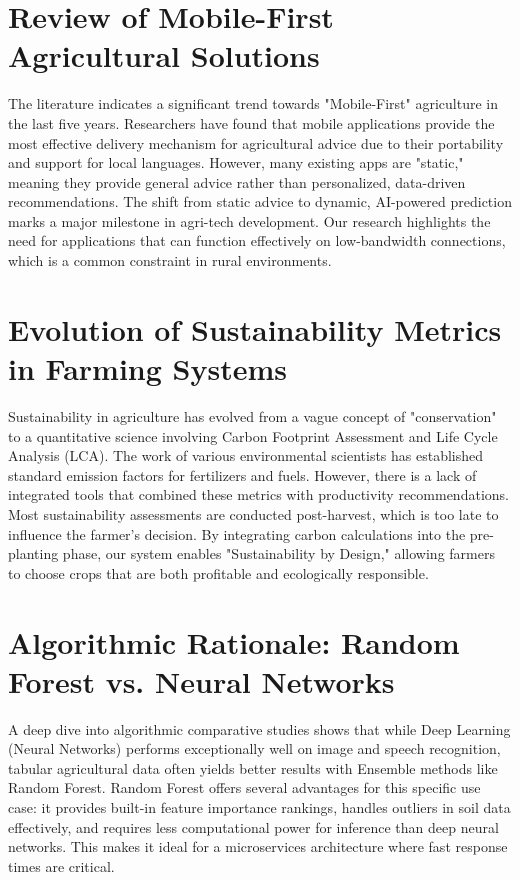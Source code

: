 \documentclass[12pt,a4paper]{report}
\begin{document}
\section{Review of Mobile-First Agricultural Solutions}
The literature indicates a significant trend towards "Mobile-First" agriculture in the last five years. Researchers have found that mobile applications provide the most effective delivery mechanism for agricultural advice due to their portability and support for local languages. However, many existing apps are "static," meaning they provide general advice rather than personalized, data-driven recommendations. The shift from static advice to dynamic, AI-powered prediction marks a major milestone in agri-tech development. Our research highlights the need for applications that can function effectively on low-bandwidth connections, which is a common constraint in rural environments.

\section{Evolution of Sustainability Metrics in Farming Systems}
Sustainability in agriculture has evolved from a vague concept of "conservation" to a quantitative science involving Carbon Footprint Assessment and Life Cycle Analysis (LCA). The work of various environmental scientists has established standard emission factors for fertilizers and fuels. However, there is a lack of integrated tools that combined these metrics with productivity recommendations. Most sustainability assessments are conducted post-harvest, which is too late to influence the farmer's decision. By integrating carbon calculations into the pre-planting phase, our system enables "Sustainability by Design," allowing farmers to choose crops that are both profitable and ecologically responsible.

\section{Algorithmic Rationale: Random Forest vs. Neural Networks}
A deep dive into algorithmic comparative studies shows that while Deep Learning (Neural Networks) performs exceptionally well on image and speech recognition, tabular agricultural data often yields better results with Ensemble methods like Random Forest. Random Forest offers several advantages for this specific use case: it provides built-in feature importance rankings, handles outliers in soil data effectively, and requires less computational power for inference than deep neural networks. This makes it ideal for a microservices architecture where fast response times are critical.
\end{document}
